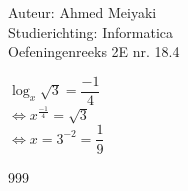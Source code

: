 \documentclass[a4paper]{article}
\begin{document}
  
\noindent \large Auteur: Ahmed Meiyaki \\
\noindent \large Studierichting: Informatica\\
\noindent \large Oefeningenreeks 2E nr. 18.4\\

\medskip

\normalsize

$\log_{x} \sqrt{3} = \dfrac{-1}{4} $\\

$\Leftrightarrow x^{\tfrac{-1}{4}} = \sqrt{3} $\\

$\Leftrightarrow x = 3^{-2} = \dfrac{1}{9} $\\


\begin{thebibliography}{999}
\end{thebibliography}
\end{document}
